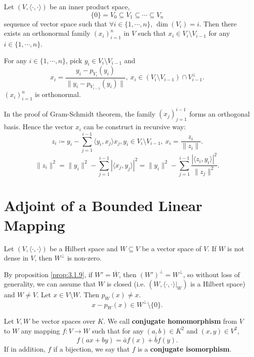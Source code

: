 \begin{theoremenv}
    Let $\left(V,\langle \cdot, \cdot\rangle\right)$ be an inner product space,
    $$ \{0\} = V_0\subseteq V_1 \subseteq \cdots \subseteq V_n$$
    sequence of vector space such that $\forall i\in \{1,\cdots,n\}$, $\dim \left(V_i\right) = i.$
    Then there exists an orthonormal family $\left(x_i\right)_{i=1}^n$ in $V$ such that $x_{i} \in V_i\setminus V_{i-1}$ for any $i\in \{1,\cdots,n\}$.
\end{theoremenv}
\begin{proofenv}
    For any $i \in \{1,\cdots,n\}$, pick $y_{i}\in V_i\setminus V_{i-1}$ and 
    $$ x_i = \frac{y_i - p_{V_i} (y_i)}{\| y_i - p_{V_{i-1}}(y_i)\|},\ x_i \in \left(V_i \setminus V_{i-1}\right)\cap V_{i-1}^\perp.$$
    $\left(x_i\right)_{i=1}^n$ is orthonormal.
\end{proofenv}
\begin{remark}
    In the proof of Gram-Schmidt theorem, the family $\left(x_j\right)_{j=1}^{i-1}$ forms an orthogonal basis.
    Hence the vector $x_i$ can be construct in recursive way:
    $$ z_i \coloneq y_i - \sum_{j=1}^{i-1} \langle y_i,x_j\rangle x_j, y_i \in V_i\setminus V_{i-1},\ x_i = \frac{z_i}{\|z_i\|}.$$
    $$ \|z_i\|^2 = \|y_i\|^2 - \sum_{j=1}^{i-1} |\langle x_j ,y_j \rangle|^2 = \|y_i\|^2 - \sum_{j=1}^{i-1}\frac{|\langle z_i, y_i\rangle|^2}{\|z_j\|^2}.$$
\end{remark}


\section{Adjoint of a Bounded Linear Mapping}

\begin{lemmaenv}\label{lem:3.3.1}
    Let $\left(V,\langle \cdot,\cdot\rangle\right)$ be a Hilbert space and $W\subseteq V$ be a vector space of $V$.
    If $W$ is not dense in $V$, then $W^\perp$ is non-zero.
\end{lemmaenv}
\begin{proofenv}
    By proposition \ref{prop:3.1.9}, if $W' = \overline{W}$, then $\left(W'\right)^\perp = W^\perp$, so without loss of generality,
    we can assume that $W$ is closed (i.e. $\left(W, \left.\langle\cdot,\cdot\rangle\right|_{W}\right)$ is a Hilbert space) and $W \neq V$.
    Let $x\in V\setminus W$. Then $p_W (x)\neq x$.
    $$ x - p_W(x) \in W^\perp\setminus \{0\}.$$
\end{proofenv}

\begin{definitionenv}
    Let $V,W$ be vector spaces over $K$.
    We call \textbf{conjugate homomorphism} from $V$ to $W$ any mapping $f:V\rightarrow W$ such that 
    for any $(a,b)\in K^2$ and $(x,y)\in V^2$,
    $$ f(ax +by) = \bar{a} f(x) + \bar{b}f(y).$$
    If in addition, $f$ if a bijection, we say that $f$ is a \textbf{conjugate isomorphism}.
\end{definitionenv}

